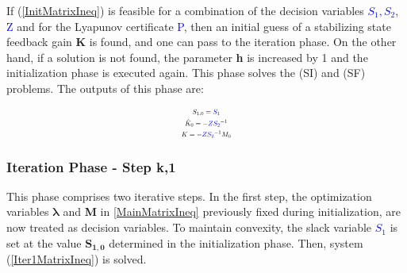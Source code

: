 If (\ref{InitMatrixIneq}) is feasible for a combination of the decision variables \textcolor{blue}{$S_1,S_2$}, \textcolor{blue}{Z} and for the  Lyapunov certificate \textcolor{blue}{P}, then an initial guess of a stabilizing state feedback gain \textbf{K} is found, and one can pass to the iteration phase. On the other hand, if a solution is not found, the parameter \textbf{h} is increased by 1 and the initialization phase is executed again. This phase solves the (SI) and (SF) problems. The outputs of this phase are:

\begin{equation}
\resizebox{0.13\textwidth}{!}{$
    \begin{gathered}
        S_{1.0}=\textcolor{blue}{S_1}  \\
        \hat{K}_0 = -\textcolor{blue}{Z} \textcolor{blue}{S_2}^{-1} \\
        K = -\textcolor{blue}{Z} \textcolor{blue}{S_2}^{-1} M_0
    \end{gathered}$}
    \label{OutputsInit}
\end{equation}

\subsubsection{Iteration Phase - Step k,1}
This phase comprises two iterative steps. In the first step, the optimization variables $\pmb{\lambda}$ and \textbf{M} in \ref{MainMatrixIneq} previously fixed during initialization, are now treated as decision variables. To maintain convexity, the slack variable \textcolor{blue}{$S_1$} is set at the value $\pmb{S_{1,0}}$ determined in the initialization phase. Then, system (\ref{Iter1MatrixIneq}) is solved.

\vspace{-0.5cm}

